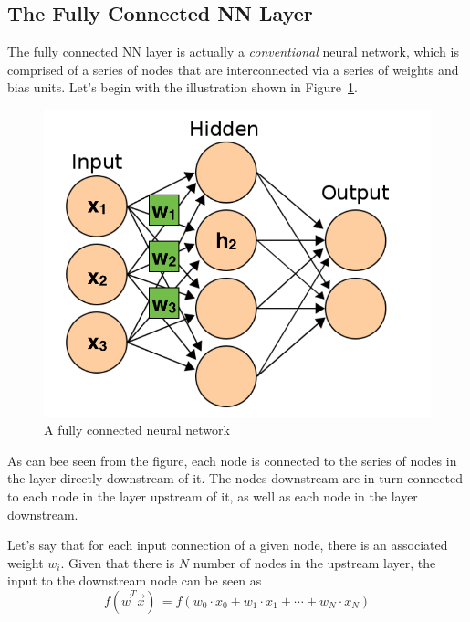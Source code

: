 \documentclass[letterpaper,12pt]{article}
\newcommand{\figref}[1]{Figure~\ref{#1}}
\begin{document}
\subsection{The Fully Connected NN Layer}

The fully connected NN layer is actually a \textit{conventional} neural network, which is comprised of a series of nodes that are interconnected via a series of weights and bias units. Let's begin with the illustration shown in \figref{ann}.

\begin{figure}[htbp]
\begin{center}
\includegraphics[scale=0.5]{images/nn_edit.png}
\caption{A fully connected neural network \cite{ann}}
\label{ann}
\end{center}
\end{figure}

As can bee seen from the figure, each node is connected to the series of nodes in the layer directly downstream of it. The nodes downstream are in turn connected to each node in the layer upstream of it, as well as each node in the layer downstream.

Let's say that for each input connection of a given node, there is an associated weight $w_i$. Given that there is $N$ number of nodes in the upstream layer, the input to the downstream node can be seen as 
\begin{equation}
f(\vec{w}^T\vec{x}) \, = f(w_0 \cdot x_0 + w_1 \cdot x_1 + \cdots + w_N \cdot x_N)
\end{equation}
\end{document}
